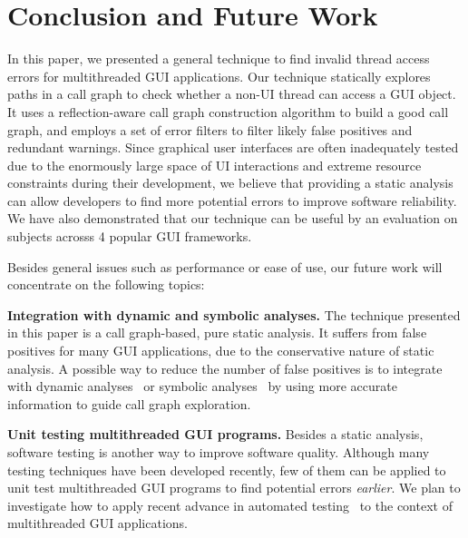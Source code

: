 \section{Conclusion and Future Work}

In this paper, we presented a general technique to find invalid
thread access errors for multithreaded GUI applications. 
Our technique statically explores paths in a call graph to check
whether a non-UI thread can access a GUI object.
It uses a reflection-aware call graph construction algorithm
to build a good call graph, and employs a set of error
filters to filter likely false positives and redundant warnings.
Since graphical user interfaces are often inadequately tested due
to the enormously large space of UI interactions and
extreme resource constraints during their development, we
believe that providing a static analysis can allow developers to find
more potential errors %
 to improve software reliability.
We have also demonstrated that our technique can be useful
by an evaluation on \subnum subjects acrosss 4 popular GUI
frameworks. 


Besides general issues such as performance or ease of use, our future
work will concentrate on the following topics:

\textbf{Integration with dynamic and symbolic analyses.} The technique 
presented in this paper is a call graph-based, pure static analysis. 
It suffers from false positives for many GUI applications,
due to the conservative nature of static analysis.
A possible way to reduce the number of false
positives is to integrate with
dynamic analyses~\cite{Jiang:2008:PPS:1453101.1453110}%
or symbolic analyses~\cite{xie05:symstra, Pasareanu:2011, halfond09issta, BMF97}
by using more accurate information to guide call graph exploration.

\textbf{Unit testing multithreaded GUI programs.} Besides
a static analysis,  software testing is another
way to improve software quality.  Although many
testing techniques have been developed recently, few of them can be applied
to unit test multithreaded GUI programs to find potential errors \textit{earlier}. We
plan to investigate how to apply recent advance in automated
testing~\cite{Staats:2011:PTO:1985793.1985847, Jagannath:2011:IMU:2025113.2025145, Muccini_Bertolino_Inverardi_2004, Ricca:2001:ATW:381473.381476, Harman:2007}
to the context of multithreaded GUI applications.


